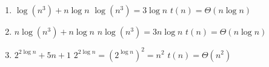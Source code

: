 \documentclass[12pt,letterpaper,final]{report}
\begin{document}
\begin{enumerate}
\item $\log(n^3) + n \log n$
\newline $ \log (n^3) = 3 \log n $
\newline $t(n) = \Theta(n \log n)$

\item $n \log (n^3) + n \log n$
\newline $ n \log (n^3) = 3n \log n $
\newline $t(n) = \Theta(n \log n)$

\item $2^{2 \log n} + 5n +1$
\newline $2^{2 \log n} = (2^{\log n})^2 = n^2$
\newline $t(n) = \Theta(n^{2})$

\end{enumerate}
\bigskip
\end{document}
